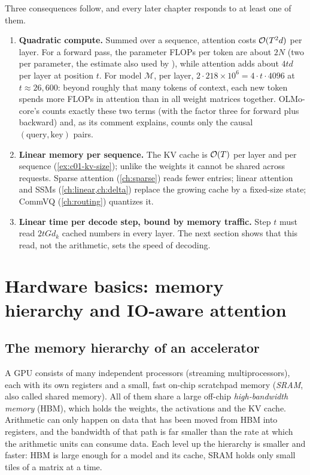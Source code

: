 Three consequences follow, and every later chapter responds to at least one of them.
\begin{enumerate}
  \item \textbf{Quadratic compute.} Summed over a sequence, attention costs $\mathcal{O}(T^2d)$
  per layer. For a forward pass, the parameter FLOPs per token are about $2N$ (two per
  parameter, the estimate also used by \citet{c01-kaplan2020scaling}), while attention adds
  about $4td$ per layer at position $t$. For model $\mathcal{M}$, per layer,
  $2\cdot 218\times 10^6 = 4\cdot t\cdot 4096$ at $t \approx 26{,}600$: beyond roughly that many tokens of context,
  each new token spends more FLOPs in attention than in all weight matrices together.
  OLMo-core's  counts exactly these two terms (with the
  factor three for forward plus backward) and, as its comment explains, counts only the
  causal $(\text{query}, \text{key})$ pairs.
  \item \textbf{Linear memory per sequence.} The KV cache is $\mathcal{O}(T)$ per layer and per
  sequence (\cref{ex:c01-kv-size}); unlike the weights it cannot be shared across requests.
  Sparse attention (\cref{ch:sparse}) reads fewer entries; linear attention and SSMs
  (\cref{ch:linear,ch:delta}) replace the growing cache by a fixed-size state; CommVQ
  (\cref{ch:routing}) quantizes it.
  \item \textbf{Linear time per decode step, bound by memory traffic.} Step $t$ must read
  $2tGd_k$ cached numbers in every layer. The next section shows that this read, not the
  arithmetic, sets the speed of decoding.
\end{enumerate}

\section{Hardware basics: memory hierarchy and IO-aware attention}\label{sec:c01-hardware}

\subsection{The memory hierarchy of an accelerator}\label{sec:c01-hierarchy}

A GPU consists of many independent processors (streaming multiprocessors), each with its own
registers and a small, fast on-chip scratchpad memory (\emph{SRAM}, also called shared
memory). All of them share a large off-chip \emph{high-bandwidth memory} (HBM), which holds
the weights, the activations and the KV cache. Arithmetic can only happen on data that has
been moved from HBM into registers, and the bandwidth of that path is far smaller than the
rate at which the arithmetic units can consume data. Each level up the hierarchy is smaller
and faster: HBM is large enough for a model and its cache, SRAM holds only small tiles of a
matrix at a time.

